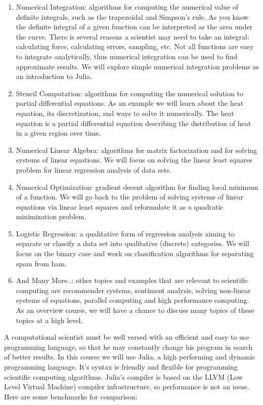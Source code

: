 \documentclass[11pt,a4paper,oneside]{report}
\begin{document}
\begin{enumerate}
\item Numerical Integration: algorithms for computing the numerical value of definite integrals, such as the trapezoidal and Simpson's rule. As you know the definite integral of a given function can be interpreted as the area under the curve. There is several reasons a scientist may need to take an integral: calculating force, calculating errors, sampling, etc. Not all functions are easy to integrate analytically, thus numerical integration can be used to find approximate results. We will explore simple numerical integration problems as an introduction to Julia.

\item Stencil Computation: algorithms for computing the numerical solution to partial differential equations. As an example we will learn about the heat equation, its discretization, and ways to solve it numerically. The heat equation is a partial differential equation describing the distribution of heat in a given region over time.

\item Numerical Linear Algebra: algorithms for matrix factorization and for solving systems of linear equations. We will focus on solving the linear least squares problem for linear regression analysis of data sets.

\item Numerical Optimization: gradient decent algorithm for finding local minimum of a function. We will go back to the problem of solving systems of linear equations via linear least squares and reformulate it as a quadratic minimization problem.

\item Logistic Regression: a qualitative form of regression analysis aiming to separate or classify a data set into qualitative (discrete) categories. We will focus on the binary case and work on classification algorithms for separating spam from ham.

\item And Many More..: other topics and examples that are relevant to scientific computing are recommender systems, sentiment analysis, solving non-linear systems of equations, parallel computing and high performance computing. As an overview course, we will have a chance to discuss many topics of these topics at a high level.\\
\end{enumerate}

\newpage
A computational scientist must be well versed with an efficient and easy to use programming language, so that he may constantly change his program in search of better results. In this course we will use Julia, a high performing and dynamic programming language. It's syntax is friendly and flexible for programming scientific computing algorithms. Julia's compiler is based on the LLVM (Low Level Virtual Machine) compiler infrastructure, so performance is not an issue. Here are some benchmarks for comparison:\\
\end{document}
